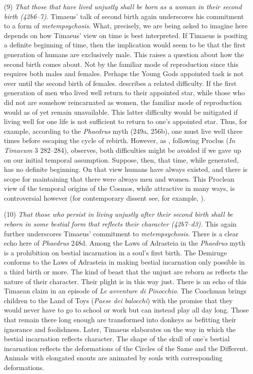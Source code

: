 (9) \emph{That those that have lived unjustly shall be born as a woman in their second birth (42b6--7).} Timaeus' talk of second birth again underscores his commitment to a form of \emph{metempsychosis}. What, precisely, we are being asked to imagine here depends on how Timaeus' view on time is best interpreted. If Timaeus is positing a definite beginning of time, then the implication would seem to be that the first generation of humans are exclusively male. This raises a question about how the second birth comes about. Not by the familiar mode of reproduction since this requires both males and females. Perhaps the Young Gods appointed task is not over until the second birth of females. \citet[261]{Taylor:1928qb} describes a related difficulty. If the first generation of men who lived well return to their appointed star, while those who did not are somehow reincarnated as women, the familiar mode of reproduction would as of yet remain unavailable. This latter difficulty would be mitigated if living well for one life is not sufficient to return to one's appointed star. Thus, for example, according to the \emph{Phaedrus} myth (249a, 256b), one must live well three times before escaping the cycle of rebirth. However, as \citet[145--6]{Cornford:1935fk}, following Proclus (\emph{In Timaeum} 3 282--284), observes, both difficulties might be avoided if we gave up on our initial temporal assumption. Suppose, then, that time, while generated, has no definite beginning. On that view humans have always existed, and there is scope for maintaining that there were always men and women. This Proclean view of the temporal origins of the Cosmos, while attractive in many ways, is controversial however (for contemporary dissent see, for example, \citealt[chapter 2]{Mohr:2005xe}).

(10) \emph{That those who persist in living unjustly after their second birth shall be reborn in some bestial form that reflects their character (42b7--d3).} This again further underscores Timaeus' commitment to \emph{metempsychosis}. There is a clear echo here of \emph{Phaedrus} 248d. Among the Laws of Adrasteia in the \emph{Phaedrus} myth is a prohibition on bestial incarnation in a soul's first birth. The Demiruge conforms to the Laws of Adrasteia in making bestial incarnation only possible in a third birth or more. The kind of beast that the unjust are reborn as reflects the nature of their character. Their plight is in this way just. There is an echo of this Timaean claim in an episode of \emph{Le avventure di Pinocchio}. The Coachman brings children to the Land of Toys (\emph{Paese dei balocchi}) with the promise that they would never have to go to school or work but can instead play all day long. Those that remain there long enough are transformed into donkeys as befitting their ignorance and foolishness. Later, Timaeus elaborates on the way in which the bestial incarnation reflects character. The shape of the skull of one's bestial incarnation reflects the deformations of the Circles of the Same and the Different. Animals with elongated snouts are animated by souls with corresponding deformations. 

